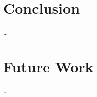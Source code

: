 \documentclass[12pt]{article}
\begin{document}
\section*{Conclusion}

\ldots

\section*{Future Work}

\ldots
\end{document}
